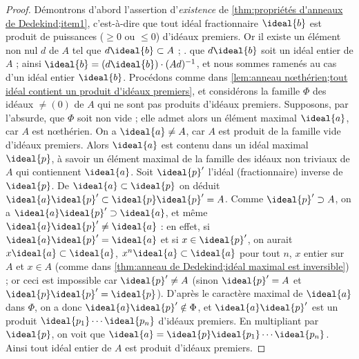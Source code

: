 \documentclass[11pt, %
  title in boldface,
  theorem in new line,
  theorem numbering = section,
  number theorems separately,
  simple name,
]{beaulivre}
\begin{document}
    \begin{proof}
        Démontrons d'abord l'assertion d'\emph{existence} de \ref{thm:propriétés d'anneaux de Dedekind;item1}, c'est-à-dire que tout idéal fractionnaire \( \ideal{b} \) est produit de puissances (\( \geqslant 0 \) ou \( \leqslant 0 \)) d'idéaux premiers. Or il existe un élément non nul \( d \) de \( A \) tel que \( d \ideal{b} \subset A \) ; \ie. que \( d \ideal{b} \) soit un idéal entier de \( A \) ; ainsi \( \ideal{b} = (d \ideal{b}) \cdot (Ad)^{-1} \), et nous sommes ramenés au cas d'un idéal entier \( \ideal{b} \). Procédons comme dans \cref{lem:anneau nœthérien;tout idéal contient un produit d'idéaux premiers}, et considérons la famille \( \Phi \) des idéaux \( \neq (0) \) de \( A \) qui ne sont pas produits d'idéaux premiers. Supposons, par l'absurde, que \( \Phi \) soit non vide ; elle admet alors un élément maximal \( \ideal{a} \), car \( A \) est nœthérien. On a \( \ideal{a} \neq A \), car \( A \) est produit de la famille vide d'idéaux premiers. Alors \( \ideal{a} \) est contenu dans un idéal maximal \( \ideal{p} \), à savoir un élément maximal de la famille des idéaux non triviaux de \( A \) qui contiennent \( \ideal{a} \). Soit \( \ideal{p}' \) l'idéal (fractionnaire) inverse de \( \ideal{p} \). De \( \ideal{a} \subset \ideal{p} \) on déduit \( \ideal{a} \ideal{p}' \subset \ideal{p}\ideal{p}' = A \). Comme \( \ideal{p}' \supset A \), on a \( \ideal{a} \ideal{p}' \supset \ideal{a} \), et même \( \ideal{a}\ideal{p}' \neq \ideal{a} \) : en effet, si \( \ideal{a} \ideal{p}' = \ideal{a} \) et si \( x \in \ideal{p}' \), on aurait \( x\ideal{a} \subset \ideal{a} \), \( x^n\ideal{a} \subset \ideal{a} \) pour tout \( n \), \( x \) entier sur \( A \) et \( x \in A \) (comme dans \cref{thm:anneau de Dedekind;idéal maximal est inversible}) ; or ceci est impossible car \( \ideal{p}' \neq A \) (sinon \( \ideal{p}' = A \) et \( \ideal{p}\ideal{p}' = \ideal{p} \)). D'après le caractère maximal de \( \ideal{a} \) dans \( \Phi \), on a donc \( \ideal{a}\ideal{p}' \notin \Phi \), et \( \ideal{a}\ideal{p}' \) est un produit \( \ideal{p_1} \cdots \ideal{p_n} \) d'idéaux premiers. En multipliant par \( \ideal{p} \), on voit que \( \ideal{a} = \ideal{p} \ideal{p_1} \cdots \ideal{p_n} \). Ainsi tout idéal entier de \( A \) est produit d'idéaux premiers.


\end{proof}
\end{document}

